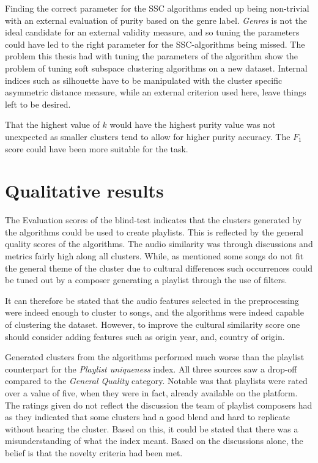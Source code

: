 \documentclass[../report.tex]{subfiles}
\begin{document}
Finding the correct parameter for the SSC algorithms ended up being non-trivial with an external evaluation of purity based on the genre label. \textit{Genres} is not the ideal candidate for an external validity measure, and so tuning the parameters could have led to the right parameter for the SSC-algorithms being missed. The problem this thesis had with tuning the parameters of the algorithm show the problem of tuning soft subspace clustering algorithms on a new dataset. Internal indices such as silhouette have to be manipulated with the cluster specific asymmetric distance measure, while an external criterion used here, leave things left to be desired.

That the highest value of $k$ would have the highest purity value was not unexpected as smaller clusters tend to allow for higher purity accuracy. The $F_1$ score could have been more suitable for the task.

\section{Qualitative results}
The Evaluation scores of the blind-test indicates that the clusters generated by the algorithms could be used to create playlists. This is reflected by the general quality scores of the algorithms. The audio similarity was through discussions and metrics fairly high along all clusters. While, as mentioned some songs do not fit the general theme of the cluster due to cultural differences such occurrences could be tuned out by a composer generating a playlist through the use of filters.

It can therefore be stated that the audio features selected in the preprocessing were indeed enough to cluster to songs, and the algorithms were indeed capable of clustering the dataset. However, to improve the cultural similarity score one should consider adding features such as origin year, and, country of origin.

Generated clusters from the algorithms performed much worse than the playlist counterpart for the \textit{Playlist uniqueness} index. All three sources saw a drop-off compared to the \textit{General Quality} category. Notable was that playlists were rated over a value of five, when they were in fact, already available on the platform. The ratings given do not reflect the discussion the team of playlist composers had as they indicated that some clusters had a good blend and hard to replicate without hearing the cluster. Based on this, it could be stated that there was a misunderstanding of what the index meant. Based on the discussions alone, the belief is that the novelty criteria had been met.
\end{document}
